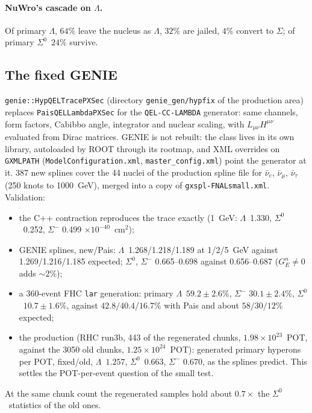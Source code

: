 \documentclass[11pt,a4paper]{article}
\newcommand{\Szero}{\ensuremath{\Sigma^{0}}}
\newcommand{\Lam}{\ensuremath{\Lambda}}
\newcommand{\numubar}{\ensuremath{\bar{\nu}_\mu}}
\begin{document}
\paragraph{NuWro's cascade on \Lam.} Of primary \Lam, $64\%$ leave the nucleus as \Lam,
$32\%$ are jailed, $4\%$ convert to $\Sigma$; of primary \Szero\ $24\%$ survive.

\subsection{The fixed GENIE}
\label{app:hypfix}
\texttt{genie::HypQELTracePXSec} (directory \texttt{genie\_gen/hypfix} of the
production area) replaces \texttt{PaisQELLambdaPXSec} for the \texttt{QEL-CC-LAMBDA} generator: same
channels, form factors, Cabibbo angle, integrator and nuclear scaling, with
$L_{\mu\nu}H^{\mu\nu}$ evaluated from Dirac matrices. GENIE is not rebuilt: the class
lives in its own library, autoloaded by ROOT through its rootmap, and XML overrides on
\texttt{GXMLPATH} (\texttt{ModelConfiguration.xml}, \texttt{master\_config.xml}) point
the generator at it. 387 new splines cover the 44 nuclei of the production spline file for
$\bar\nu_e$, $\numubar$, $\bar\nu_\tau$ (250 knots to 1000~GeV), merged into a copy of
\texttt{gxspl-FNALsmall.xml}. Validation:
\begin{itemize}
  \item the C++ contraction reproduces the trace exactly (1~GeV: \Lam\ 1.330, \Szero\
        0.252, $\Sigma^-$ 0.499 $\times10^{-40}$~cm$^2$);
  \item GENIE splines, new/Pais: \Lam\ 1.268/1.218/1.189 at 1/2/5~GeV against
        1.269/1.216/1.185 expected; \Szero, $\Sigma^-$ 0.665--0.698 against 0.656--0.687
        ($G_E^n\neq0$ adds $\sim2\%$);
  \item a 360-event FHC \texttt{lar} generation: primary \Lam\ $59.2\pm2.6\%$, $\Sigma^-$
        $30.1\pm2.4\%$, \Szero\ $10.7\pm1.6\%$, against $42.8/40.4/16.7\%$ with Pais and
        about $58/30/12\%$ expected;
  \item the production (RHC run3b, 443 of the regenerated chunks, $1.98\times10^{23}$~POT,
        against the 3050 old chunks, $1.25\times10^{24}$~POT): generated primary hyperons per POT,
        fixed/old, \Lam\ $1.257$, \Szero\ $0.663$, $\Sigma^-$ $0.670$, as the splines predict.
        This settles the POT-per-event question of the small test.
\end{itemize}
At the same chunk count the regenerated samples hold about $0.7\times$ the \Szero\
statistics of the old ones.
\end{document}
